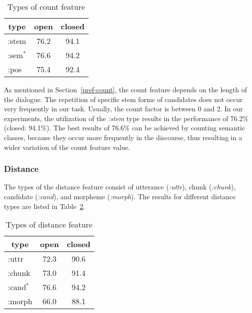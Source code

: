 \setlength{\tabcolsep}{3pt}
\begin{table}[hbt]
 \vspace*{-1.25\baselineskip}
 \begin{center}
    \caption{Types of count feature}\label{tab-count-type} 
    \begin{tabular}{l|cc}
        \multicolumn{1}{c|}{type} & open & closed \\ 
        \hline
        :stem                 & 76.2 & 94.1 \\
        :sem{\large ${}^{*}$} & 76.6 & 94.2 \\
        :pos                  & 75.4 & 92.4 \\
        \hline
    \end{tabular}
    \vspace*{-1.5\baselineskip}
  \end{center}
\end{table}

As mentioned in Section~\ref{pref-count}, the count feature depends on the length of the dialogue.
The repetition of specific stem forms of candidates does not occur very frequently in our task.
Usually, the count factor is between 0 and 2. In our experiments, the utilization of the {\em :stem} type
results in the performance of 76.2\% (closed: 94.1\%).
The best results of 76.6\% can be achieved by counting semantic classes, because they occur more frequently
in the discourse, thus resulting in a wider variation of the count feature value.

\subsubsection{Distance}
\label{pref-dist-type}

The types of the distance feature consist of utterance ({\em :uttr}), chunk ({\em :chunk}),
candidate ({\em :cand}), and morpheme ({\em :morph}).
The results for different distance types are listed in Table~\ref{tab-dist-type}.

\begin{table}[hbt]
 \vspace*{-1\baselineskip}
 \begin{center}
    \caption{Types of distance feature}\label{tab-dist-type} 
    \begin{tabular}{l|cc}
        \multicolumn{1}{c|}{type} & open & closed \\
        \hline
        :uttr & 72.3 & 90.6 \\
        :chunk  & 73.0 & 91.4 \\
        :cand{\large ${}^{*}$} & 76.6 & 94.2 \\
        :morph & 66.0 & 88.1 \\
        \hline
    \end{tabular}
    \vspace*{-1\baselineskip}
  \end{center}
\end{table}

